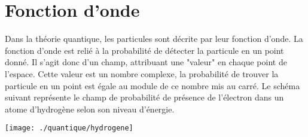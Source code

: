 
\section{Fonction d'onde}
%
Dans la théorie quantique, les particules sont décrite par leur fonction d'onde.
La fonction d'onde est relié à la probabilité de détecter la particule en un point donné.
Il s'agit donc d'un champ, attribuant une "valeur" en chaque point de l'espace.
{\footnotesize Cette valeur est un nombre complexe, la probabilité de trouver la particule en un point est égale au module de ce nombre mis au carré}.
Le schéma suivant représente le champ de probabilité de présence de l'électron dans un atome d'hydrogène selon son niveau d'énergie.

\begin{center}
\texttt{[image: ./quantique/hydrogene]}
\end{center}


